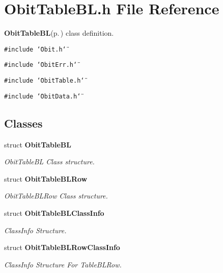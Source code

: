 \section{Obit\-Table\-BL.h File Reference}
\label{ObitTableBL_8h}
{\bf Obit\-Table\-BL}{\rm (p.\,\pageref{structObitTableBL})} class definition. 

{\tt \#include \char`\"{}Obit.h\char`\"{}}\par
{\tt \#include \char`\"{}Obit\-Err.h\char`\"{}}\par
{\tt \#include \char`\"{}Obit\-Table.h\char`\"{}}\par
{\tt \#include \char`\"{}Obit\-Data.h\char`\"{}}\par
\subsection*{Classes}
\begin{CompactItemize}
\item 
struct {\bf Obit\-Table\-BL}
\begin{CompactList}\small\item\em Obit\-Table\-BL Class structure. \item\end{CompactList}\item 
struct {\bf Obit\-Table\-BLRow}
\begin{CompactList}\small\item\em Obit\-Table\-BLRow Class structure. \item\end{CompactList}\item 
struct {\bf Obit\-Table\-BLClass\-Info}
\begin{CompactList}\small\item\em Class\-Info Structure. \item\end{CompactList}\item 
struct {\bf Obit\-Table\-BLRow\-Class\-Info}
\begin{CompactList}\small\item\em Class\-Info Structure For Table\-BLRow. \item\end{CompactList}\end{CompactItemize}
